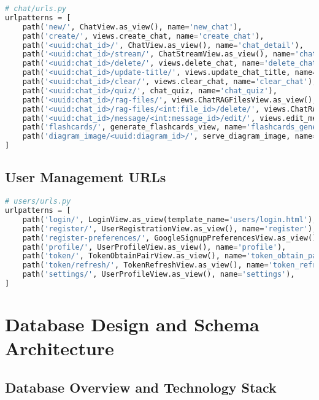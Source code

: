 \documentclass[12pt,a4paper]{article}
\begin{document}
\begin{lstlisting}[language=Python, caption=Chat URL Patterns]
# chat/urls.py
urlpatterns = [
    path('new/', ChatView.as_view(), name='new_chat'),
    path('create/', views.create_chat, name='create_chat'),
    path('<uuid:chat_id>/', ChatView.as_view(), name='chat_detail'),
    path('<uuid:chat_id>/stream/', ChatStreamView.as_view(), name='chat_stream'),
    path('<uuid:chat_id>/delete/', views.delete_chat, name='delete_chat'),
    path('<uuid:chat_id>/update-title/', views.update_chat_title, name='update_chat_title'),
    path('<uuid:chat_id>/clear/', views.clear_chat, name='clear_chat'),
    path('<uuid:chat_id>/quiz/', chat_quiz, name='chat_quiz'),
    path('<uuid:chat_id>/rag-files/', views.ChatRAGFilesView.as_view(), name='list_rag_files'),
    path('<uuid:chat_id>/rag-files/<int:file_id>/delete/', views.ChatRAGFilesView.as_view(), name='delete_rag_file'),
    path('<uuid:chat_id>/message/<int:message_id>/edit/', views.edit_message, name='edit_message'),
    path('flashcards/', generate_flashcards_view, name='flashcards_generator'),
    path('diagram_image/<uuid:diagram_id>/', serve_diagram_image, name='serve_diagram_image'),
]
\end{lstlisting}

\subsection{User Management URLs}

\begin{lstlisting}[language=Python, caption=User URL Patterns]
# users/urls.py
urlpatterns = [
    path('login/', LoginView.as_view(template_name='users/login.html'), name='login'),
    path('register/', UserRegistrationView.as_view(), name='register'),
    path('register-preferences/', GoogleSignupPreferencesView.as_view(), name='google_preferences'),
    path('profile/', UserProfileView.as_view(), name='profile'),
    path('token/', TokenObtainPairView.as_view(), name='token_obtain_pair'),
    path('token/refresh/', TokenRefreshView.as_view(), name='token_refresh'),
    path('settings/', UserProfileView.as_view(), name='settings'),
]
\end{lstlisting}

\section{Database Design and Schema Architecture}

\subsection{Database Overview and Technology Stack}
\end{document}
